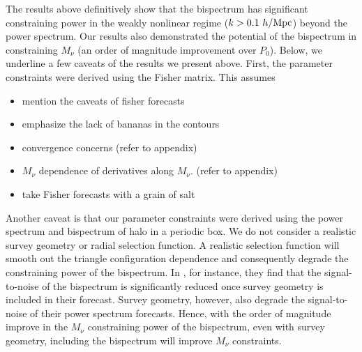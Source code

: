 \documentclass[12pt, letterpaper, preprint]{aastex62}
\newcommand{\smnu}{M_\nu}
\newcommand{\bitem}{\begin{itemize}}
\newcommand{\eitem}{\end{itemize}}
\begin{document}
The results above definitively show that the bispectrum has significant 
constraining power in the weakly nonlinear regime ($k > 0.1~h/{\rm Mpc}$) 
beyond the power spectrum. Our results also demonstrated the potential of 
the bispectrum in constraining $\smnu$ (an order of magnitude improvement over 
$P_0$). Below, we underline a few caveats of the results we present above. 
First, the parameter constraints were derived using the Fisher matrix. This 
assumes 
\bitem
\item mention the caveats of fisher forecasts
\item emphasize the lack of bananas in the contours
\item convergence concerns (refer to appendix) 
\item $\smnu$ dependence of derivatives along $\smnu$. (refer to appendix) 
\item take Fisher forecasts with a grain of salt 
\eitem 

Another caveat is that our parameter constraints were derived using the power 
spectrum and bispectrum of halo in a periodic box. We do not consider a 
realistic survey geometry or radial selection function. A realistic selection 
function will smooth out the triangle configuration dependence and consequently 
degrade the constraining power of the bispectrum. In \cite{sefusatti2005}, for 
instance, they find that the signal-to-noise of the bispectrum is significantly 
reduced once survey geometry is included in their forecast. Survey geometry, 
however, also degrade the signal-to-noise of their power spectrum forecasts. 
Hence, with the order of magnitude improve in the $\smnu$ constraining power 
of the bispectrum, even with survey geometry, including the bispectrum will 
improve $\smnu$ constraints. 
\end{document}
